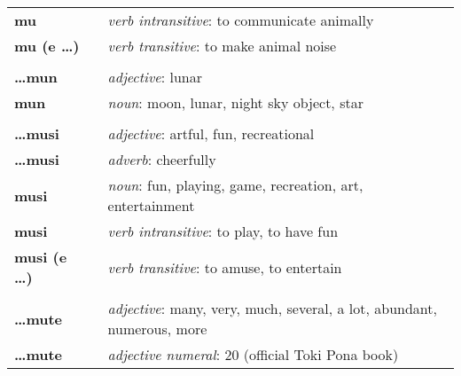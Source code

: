 \begin{supertabular}{p{2,5cm}|ll}
    \textbf{mu}                  &  & \textit{verb intransitive}: to communicate animally                                                        \\
    \textbf{mu (e \dots)}        &  & \textit{verb transitive}: to make animal noise                                                             \\
                                 &  &                                                                                                            \\ %
    \textbf{\dots mun}           &  & \textit{adjective}: lunar                                                                                  \\
    \textbf{mun}                 &  & \textit{noun}: moon, lunar, night sky object, star                                                         \\
                                 &  &                                                                                                            \\ %
    \textbf{\dots musi}          &  & \textit{adjective}: artful, fun, recreational                                                              \\
    \textbf{\dots musi}          &  & \textit{adverb}: cheerfully                                                                                \\
    \textbf{musi}                &  & \textit{noun}: fun, playing, game, recreation, art, entertainment                                          \\
    \textbf{musi}                &  & \textit{verb intransitive}: to play, to have fun                                                           \\
    \textbf{musi (e \dots)}      &  & \textit{verb transitive}: to amuse, to entertain                                                           \\
                                 &  &                                                                                                            \\ %
    \textbf{\dots mute}          &  & \textit{adjective}: many, very, much, several, a lot, abundant, numerous, more                             \\
    \textbf{\dots mute}          &  & \textit{adjective numeral}: 20 (official Toki Pona book)                                                   \\

\end{supertabular}
